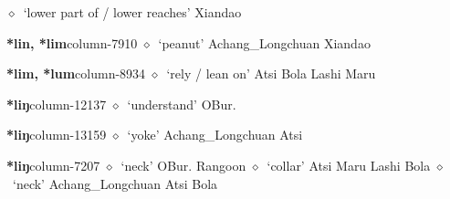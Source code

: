          $\diamond$~`lower part of / lower reaches'
         Xiandao 
  \item {\footnotesize \textbf{*lin, *lim}}{\tiny column-7910}
         $\diamond$~`peanut'
         Achang\_Longchuan 
\hspace{1ex}
         Xiandao 
  \item {\footnotesize \textbf{*lim, *lum}}{\tiny column-8934}
         $\diamond$~`rely / lean on'
         Atsi 
\hspace{1ex}
         Bola 
\hspace{1ex}
         Lashi 
\hspace{1ex}
         Maru 
  \item {\footnotesize \textbf{*liŋ}}{\tiny column-12137}
         $\diamond$~`understand'
         OBur. 
  \item {\footnotesize \textbf{*liŋ}}{\tiny column-13159}
         $\diamond$~`yoke'
         Achang\_Longchuan 
\hspace{1ex}
         Atsi 
  \item {\footnotesize \textbf{*liŋ}}{\tiny column-7207}
         $\diamond$~`neck'
         OBur. 
\hspace{1ex}
         Rangoon 
\hspace{1ex}
         $\diamond$~`collar'
         Atsi 
\hspace{1ex}
         Maru 
\hspace{1ex}
         Lashi 
\hspace{1ex}
         Bola 
\hspace{1ex}
         $\diamond$~`neck'
         Achang\_Longchuan 
\hspace{1ex}
         Atsi 
\hspace{1ex}
         Bola 
\hspace{1ex}
